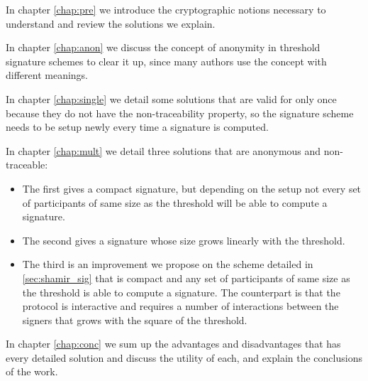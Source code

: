 In chapter \ref{chap:pre} we introduce the cryptographic notions necessary to understand and review the solutions we explain.

In chapter \ref{chap:anon} we discuss the concept of anonymity in threshold signature schemes to clear it up, since many authors use the concept with different meanings.

In chapter \ref{chap:single} we detail some solutions that are valid for only once because they do not have the non-traceability property, so the signature scheme needs to be setup newly every time a signature is computed.

In chapter \ref{chap:mult} we detail three solutions that are anonymous and non-traceable:
\begin{itemize}[align = left, leftmargin=*, label={--}]
\item The first gives a compact signature, but depending on the setup not every set of participants of same size as the threshold will be able to compute a signature.
\item The second gives a signature whose size grows linearly with the threshold.
\item The third is an improvement we propose on the scheme detailed in \ref{sec:shamir_sig} that is compact and any set of participants of same size as the threshold is able to compute a signature. The counterpart is that the protocol is interactive and requires a number of interactions between the signers that grows with the square of the threshold.
\end{itemize}

In chapter \ref{chap:conc} we sum up the advantages and disadvantages that has every detailed solution and discuss the utility of each, and explain the conclusions of the work.